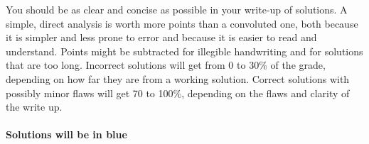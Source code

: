 \documentclass[11pt]{article}
\begin{document}
You should be as clear and concise as possible in your write-up of
solutions. 
A simple, direct analysis is worth more points than a
convoluted one, both because it is simpler and less prone to error and
because it is easier to read and understand. Points might be
subtracted for illegible handwriting and for solutions that are too
long. Incorrect solutions will get from 0 to 30\% of the grade,
depending on how far they are from a working solution. Correct
solutions with possibly minor flaws will get 70 to 100\%, depending on
the flaws and clarity of the write up.

\color{teal}
\paragraph{Solutions will be in blue}
\end{document}
